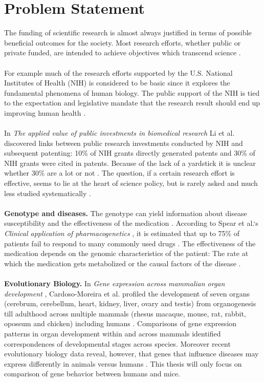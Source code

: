 \documentclass{article}
\begin{document}
\section{Problem Statement}
The funding of scientific research is almost always justified in terms of possible beneficial outcomes for the society. Most research efforts, whether public or private funded, are intended to achieve objectives which transcend science \cite{Sarewitz2007TheNH}. \\
\\
For example much of the research efforts supported by the U.S. National Institutes of Health (NIH) is considered to be basic since it explores the fundamental phenomena of human biology. The public support of the NIH is tied to the expectation and legislative mandate that the research result should end up improving human health \cite{Sarewitz2007TheNH}. \\
\\
In \textit{The applied value of public investments in biomedical research}\cite{Li2017TheAV} Li et al. discovered links between public research investments conducted by NIH and subsequent patenting: 10\% of NIH grants directly generated patents and 30\% of NIH grants were cited in patents. Because of the lack of a yardstick it is unclear whether 30\% are a lot or not \cite{Li2017TheAV}. The question, if a certain research effort is effective, seems to lie at the heart of science policy, but is rarely asked and much less studied systematically \cite{Sarewitz2007TheNH}. \\
\\
\textbf{Genotype and diseases.} The genotype can yield information about disease susceptibility and the effectiveness of the medication \cite{Brunicardi2011OverviewOT}. According to Spear et al.`s \textit{Clinical application of pharmacogenetics} \cite{Spear2001ClinicalAO}, it is estimated that up to 75\% of patients fail to respond to many commonly used drugs \cite{Spear2001ClinicalAO}. The effectiveness of the medication depends on the genomic characteristics of the patient: The rate at which the medication gets metabolized or the causal factors of the disease \cite{Brunicardi2011OverviewOT}. \\
\\
\textbf{Evolutionary Biology.} In \textit{Gene expression across mammalian organ development} \cite{CardosoMoreira2019GeneEA}, Cardoso-Moreira et al. profiled the development of seven organs (cerebrum, cerebellum, heart, kidney, liver, ovary and testis) from organogenesis till adulthood across multiple mammals (rhesus macaque, mouse, rat, rabbit, opossum and chicken) including humans \cite{CardosoMoreira2019GeneEA}. Comparisons of gene expression patterns in organ development within and across mammals identified correspondences of developmental stages across species. Moreover recent evolutionary biology data reveal, however, that genes that influence diseases may express differently in animals versus humans \cite{CardosoMoreira2019GeneEA}. This thesis will only focus on comparison of gene behavior between humans and mice.\\
\end{document}
